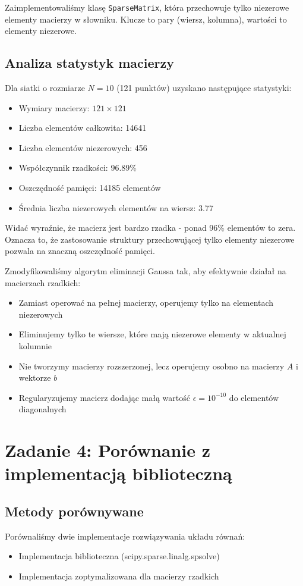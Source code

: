 \documentclass[12pt,a4paper]{article}
\begin{document}
Zaimplementowaliśmy klasę \texttt{SparseMatrix}, która przechowuje tylko niezerowe elementy macierzy w słowniku. Klucze to pary (wiersz, kolumna), wartości to elementy niezerowe.


\subsection{Analiza statystyk macierzy}

Dla siatki o rozmiarze $N=10$ (121 punktów) uzyskano następujące statystyki:
\begin{itemize}
    \item Wymiary macierzy: $121 \times 121$
    \item Liczba elementów całkowita: 14641
    \item Liczba elementów niezerowych: 456
    \item Współczynnik rzadkości: 96.89\%
    \item Oszczędność pamięci: 14185 elementów
    \item Średnia liczba niezerowych elementów na wiersz: 3.77
\end{itemize}

Widać wyraźnie, że macierz jest bardzo rzadka - ponad 96\% elementów to zera. Oznacza to, że zastosowanie struktury przechowującej tylko elementy niezerowe pozwala na znaczną oszczędność pamięci.

Zmodyfikowaliśmy algorytm eliminacji Gaussa tak, aby efektywnie działał na macierzach rzadkich:
\begin{itemize}
    \item Zamiast operować na pełnej macierzy, operujemy tylko na elementach niezerowych
    \item Eliminujemy tylko te wiersze, które mają niezerowe elementy w aktualnej kolumnie
    \item Nie tworzymy macierzy rozszerzonej, lecz operujemy osobno na macierzy $A$ i wektorze $b$
    \item Regularyzujemy macierz dodając małą wartość $\epsilon = 10^{-10}$ do elementów diagonalnych
\end{itemize}

\section{Zadanie 4: Porównanie z implementacją biblioteczną}
\subsection{Metody porównywane}
Porównaliśmy dwie implementacje rozwiązywania układu równań:
\begin{itemize}
    \item Implementacja biblioteczna (scipy.sparse.linalg.spsolve)
    \item Implementacja zoptymalizowana dla macierzy rzadkich
\end{itemize}
\end{document}

